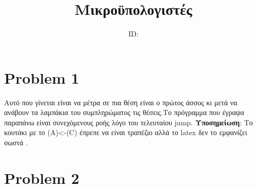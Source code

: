 \documentclass{article}
\title{Μικροϋπολογιστές \\ \exerciseset}
\author{\studentname \qquad  ID: \suid}
\begin{document}
\maketitle



\section*{Problem 1}
	


	Αυτό που γίνεται είναι να μέτρα σε πια θέση είναι ο πρώτος άσσος κι μετά να ανάβουν τα λαμπάκια του συμπληρώματος τις θέσεις.Το πρόγραμμα που έγραψα παραπάνω είναι συνεχόμενους ροής λόγο του τελευταίου jump.
\textbf{	Υποσημείωση}: Το κουτάκι με το (Α)<-(C) έπρεπε να είναι τραπέζιο αλλά το latex δεν το εμφανίζει σωστά .
\section*{Problem 2}

\end{document}
